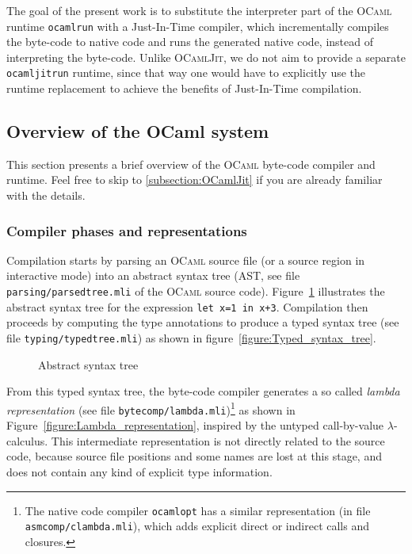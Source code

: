 \documentclass[10pt,a4paper,twocolumn]{article}
\begin{document}
The goal of the present work is to substitute the interpreter part of the \textsc{OCaml} runtime
\texttt{ocamlrun} with a Just-In-Time compiler, which incrementally compiles the byte-code to
native code and runs the generated native code, instead of interpreting the byte-code. Unlike
\textsc{OCamlJit}\cite{Starynkevitch04}, we do not aim to provide a separate \texttt{ocamljitrun}
runtime, since that way one would have to explicitly use the runtime replacement to achieve the
benefits of Just-In-Time compilation.

\subsection{Overview of the OCaml system}

This section presents a brief overview of the \textsc{OCaml} byte-code compiler and runtime.
Feel free to skip to \ref{subsection:OCamlJit} if you are already familiar with the details.

\subsubsection{Compiler phases and representations}

Compilation starts by parsing an \textsc{OCaml} source file (or a source region in interactive
mode) into an abstract syntax tree (AST, see file \texttt{parsing/parsedtree.mli} of the \textsc{OCaml}
source code). Figure~\ref{figure:Abstract_syntax_tree} illustrates the abstract syntax tree for the expression
\texttt{let x=1 in x+3}. Compilation then proceeds by computing the type annotations to produce
a typed syntax tree (see file \texttt{typing/typedtree.mli}) as shown in figure~\ref{figure:Typed_syntax_tree}.

\begin{figure}[ht]
  \centering
  \caption{Abstract syntax tree}
  \label{figure:Abstract_syntax_tree}
\end{figure}

From this typed syntax tree, the byte-code compiler generates a so called {\em lambda representation} (see
file \texttt{bytecomp/lambda.mli})\footnote{The native code compiler \texttt{ocamlopt} has a similar
  representation (in file \texttt{asmcomp/clambda.mli}), which adds explicit direct or indirect calls and
  closures.} as shown in Figure~\ref{figure:Lambda_representation}, inspired by
the untyped call-by-value $\lambda$-calculus. This intermediate representation is not directly related to the
source code, because source file positions and some names are lost at this stage, and does not contain any
kind of explicit type information.
\end{document}
